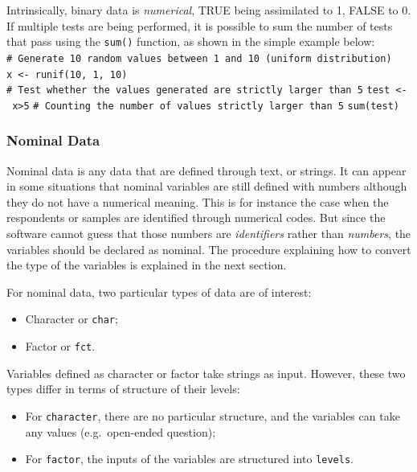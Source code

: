 \documentclass[
]{krantz}
\providecommand{\tightlist}{%
  \setlength{\itemsep}{0pt}\setlength{\parskip}{0pt}}
\renewenvironment{quote}{\begin{VF}}{\end{VF}}
\begin{document}
\begin{quote}
Intrinsically, binary data is \emph{numerical}, TRUE being assimilated to 1, FALSE to 0. If multiple tests are being performed, it is possible to sum the number of tests that pass using the \texttt{sum()} function, as shown in the simple example below:
\texttt{\#\ Generate\ 10\ random\ values\ between\ 1\ and\ 10\ (uniform\ distribution)}
\texttt{x\ \textless{}-\ runif(10,\ 1,\ 10)}
\texttt{\#\ Test\ whether\ the\ values\ generated\ are\ strictly\ larger\ than\ 5}
\texttt{test\ \textless{}-\ x\textgreater{}5}
\texttt{\#\ Counting\ the\ number\ of\ values\ strictly\ larger\ than\ 5}
\texttt{sum(test)}
\end{quote}

\hypertarget{nominal-data}{%
\subsubsection{Nominal Data}\label{nominal-data}}

Nominal data is any data that are defined through text, or strings. It can appear in some situations that nominal variables are still defined with numbers although they do not have a numerical meaning. This is for instance the case when the respondents or samples are identified through numerical codes. But since the software cannot guess that those numbers are \emph{identifiers} rather than \emph{numbers}, the variables should be declared as nominal. The procedure explaining how to convert the type of the variables is explained in the next section.

For nominal data, two particular types of data are of interest:

\begin{itemize}
\tightlist
\item
  Character or \texttt{char};
\item
  Factor or \texttt{fct}.
\end{itemize}

Variables defined as character or factor take strings as input. However, these two types differ in terms of structure of their levels:

\begin{itemize}
\tightlist
\item
  For \texttt{character}, there are no particular structure, and the variables can take any values (e.g.~open-ended question);
\item
  For \texttt{factor}, the inputs of the variables are structured into \texttt{levels}.
\end{itemize}
\end{document}
